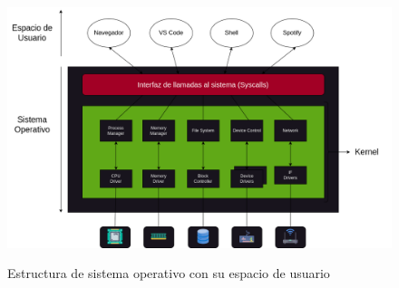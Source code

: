 \documentclass{libs/ufc_format}
\begin{document}
\begin{frame}{}
  \begin{figure}
    \centering
    \caption{Estructura de sistema operativo con su espacio de usuario}
    \includegraphics[scale=0.25]{libs/img/Estructura_kernel.png}
    \label{fig:Estructura Kernel}
  \end{figure}
\end{frame}
\end{document}
